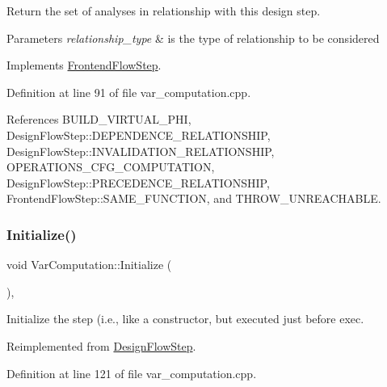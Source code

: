 Return the set of analyses in relationship with this design step. 


\begin{DoxyParams}{Parameters}
{\em relationship\+\_\+type} & is the type of relationship to be considered \\
\hline
\end{DoxyParams}


Implements \hyperlink{classFrontendFlowStep_abeaff70b59734e462d347ed343dd700d}{Frontend\+Flow\+Step}.



Definition at line 91 of file var\+\_\+computation.\+cpp.



References B\+U\+I\+L\+D\+\_\+\+V\+I\+R\+T\+U\+A\+L\+\_\+\+P\+HI, Design\+Flow\+Step\+::\+D\+E\+P\+E\+N\+D\+E\+N\+C\+E\+\_\+\+R\+E\+L\+A\+T\+I\+O\+N\+S\+H\+IP, Design\+Flow\+Step\+::\+I\+N\+V\+A\+L\+I\+D\+A\+T\+I\+O\+N\+\_\+\+R\+E\+L\+A\+T\+I\+O\+N\+S\+H\+IP, O\+P\+E\+R\+A\+T\+I\+O\+N\+S\+\_\+\+C\+F\+G\+\_\+\+C\+O\+M\+P\+U\+T\+A\+T\+I\+ON, Design\+Flow\+Step\+::\+P\+R\+E\+C\+E\+D\+E\+N\+C\+E\+\_\+\+R\+E\+L\+A\+T\+I\+O\+N\+S\+H\+IP, Frontend\+Flow\+Step\+::\+S\+A\+M\+E\+\_\+\+F\+U\+N\+C\+T\+I\+ON, and T\+H\+R\+O\+W\+\_\+\+U\+N\+R\+E\+A\+C\+H\+A\+B\+LE.

\mbox{\label{classVarComputation_a99f7f770ae1073b7e563159ef4fa42a5}} 
\subsubsection{\texorpdfstring{Initialize()}{Initialize()}}
{\footnotesize\ttfamily void Var\+Computation\+::\+Initialize (\begin{DoxyParamCaption}{ }\end{DoxyParamCaption})\hspace{0.3cm}{\ttfamily [override]}, {\ttfamily [virtual]}}



Initialize the step (i.\+e., like a constructor, but executed just before exec. 



Reimplemented from \hyperlink{classDesignFlowStep_a44b50683382a094976e1d432a7784799}{Design\+Flow\+Step}.



Definition at line 121 of file var\+\_\+computation.\+cpp.



